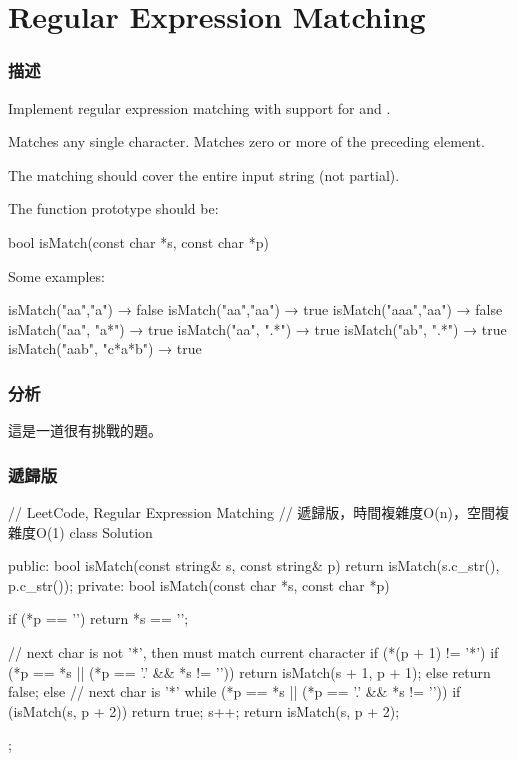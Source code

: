 \section{Regular Expression Matching} %
\label{sec:regular-expression-matching}


\subsubsection{描述}
Implement regular expression matching with support for  and .

 Matches any single character.
 Matches zero or more of the preceding element.

The matching should cover the entire input string (not partial).

The function prototype should be:
\begin{Code}
bool isMatch(const char *s, const char *p)
\end{Code}

Some examples:
\begin{Code}
isMatch("aa","a") → false
isMatch("aa","aa") → true
isMatch("aaa","aa") → false
isMatch("aa", "a*") → true
isMatch("aa", ".*") → true
isMatch("ab", ".*") → true
isMatch("aab", "c*a*b") → true
\end{Code}


\subsubsection{分析}
這是一道很有挑戰的題。


\subsubsection{遞歸版}
\begin{Code}
// LeetCode, Regular Expression Matching
// 遞歸版，時間複雜度O(n)，空間複雜度O(1)
class Solution {
public:
    bool isMatch(const string& s, const string& p) {
        return isMatch(s.c_str(), p.c_str());
    }
private:
    bool isMatch(const char *s, const char *p) {
        if (*p == '\0') return *s == '\0';

        // next char is not '*', then must match current character
        if (*(p + 1) != '*') {
            if (*p == *s || (*p == '.' && *s != '\0'))
                return isMatch(s + 1, p + 1);
            else
                return false;
        } else { // next char is '*'
            while (*p == *s || (*p == '.' && *s != '\0')) {
                if (isMatch(s, p + 2))
                    return true;
                s++;
            }
            return isMatch(s, p + 2);
        }
    }
};
\end{Code}


